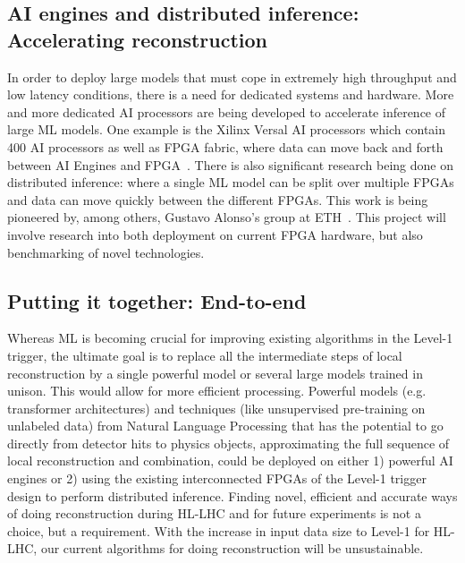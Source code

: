 \documentclass[12pt]{iopart}
\begin{document}
\subsection{AI engines and distributed inference: Accelerating reconstruction}
In order to deploy large models that must cope in extremely high throughput and low latency conditions, there is a need for dedicated systems and hardware. More and more dedicated AI processors are being developed to accelerate inference of large ML models. One example is the Xilinx Versal AI processors which contain 400 AI processors as well as FPGA fabric, where data can move back and forth between AI Engines and FPGA~\cite{XilinxVersalAI}. There is also significant research being done on distributed inference: where a single ML model can be split over multiple FPGAs and data can move quickly between the different FPGAs. This work is being pioneered by, among others, Gustavo Alonso's group at ETH~\cite{AlonsoWebpage}. This project will involve research into both deployment on current FPGA hardware, but also benchmarking of novel technologies.

\subsection{Putting it together: End-to-end}
Whereas ML is becoming crucial for improving existing algorithms in the Level-1 trigger, the ultimate goal is to replace all the intermediate steps of local reconstruction by a single powerful model or several large models trained in unison. This would allow for more efficient processing. Powerful models (e.g. transformer architectures) and techniques (like unsupervised pre-training on unlabeled data) from Natural Language Processing  that has the potential to go directly from detector hits to physics objects, approximating the full sequence of local reconstruction and combination, could be deployed on either 1) powerful AI engines or 2) using the existing interconnected FPGAs of the Level-1 trigger design to perform distributed inference. Finding novel, efficient and accurate ways of doing reconstruction during HL-LHC and for future experiments is not a choice, but a requirement. With the increase in input data size to Level-1 for HL-LHC, our current algorithms for doing reconstruction will be unsustainable.
\end{document}
